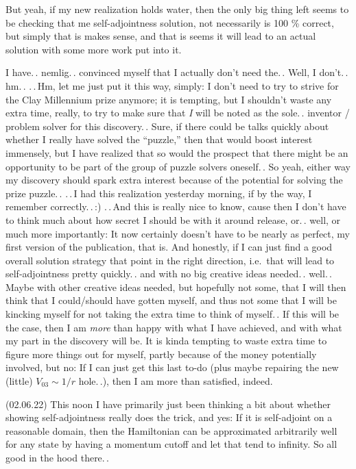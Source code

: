 \documentclass{report}
\begin{document}
But yeah, if my new realization holds water, then the only big thing left seems to be checking that me self-adjointness solution, not necessarily is 100 \% correct, but simply that is makes sense, and that is seems it will lead to an actual solution with some more work put into it. 

I have.\,. nemlig.\,. convinced myself that I actually don't need the.\,. Well, I don't.\,. hm.\,. .\,.\,Hm, let me just put it this way, simply: I don't need to try to strive for the Clay Millennium prize anymore; it is tempting, but I shouldn't waste any extra time, really, to try to make sure that \emph{I} will be noted as the sole.\,. inventor / problem solver for this discovery.\,. Sure, if there could be talks quickly about whether I really have solved the ``puzzle,'' then that would boost interest immensely, but I have realized that so would the prospect that there might be an opportunity to be part of the group of puzzle solvers oneself.\,. So yeah, either way my discovery should spark extra interest because of the potential for solving the prize puzzle.\,. .\,.\,I had this realization yesterday morning, if by the way, I remember correctly.\,.\,:) .\,.\,And this is really nice to know, cause then I don't have to think much about how secret I should be with it around release, or.\,. well, or much more importantly: It now certainly doesn't have to be nearly as perfect, my first version of the publication, that is. And honestly, if I can just find a good overall solution strategy that point in the right direction, i.e.\ that will lead to self-adjointness pretty quickly.\,. and with no big creative ideas needed.\,. well.\,. Maybe with other creative ideas needed, but hopefully not some, that I will then think that I could/should have gotten myself, and thus not some that I will be kincking myself for not taking the extra time to think of myself.\,. If this will be the case, then I am \emph{more} than happy with what I have achieved, and with what my part in the discovery will be. It is kinda tempting to waste extra time to figure more things out for myself, partly because of the money potentially involved, but no: If I can just get this last to-do (plus maybe repairing the new (little) $V_{03} \sim 1/r$ hole.\,.), then I am more than satisfied, indeed. %

(02.06.22) This noon I have primarily just been thinking a bit about whether showing self-adjointness really does the trick, and yes: If it is self-adjoint on a reasonable domain, then the Hamiltonian can be approximated arbitrarily well for any state by having a momentum cutoff and let that tend to infinity. So all good in the hood there.\,. 
\end{document}
